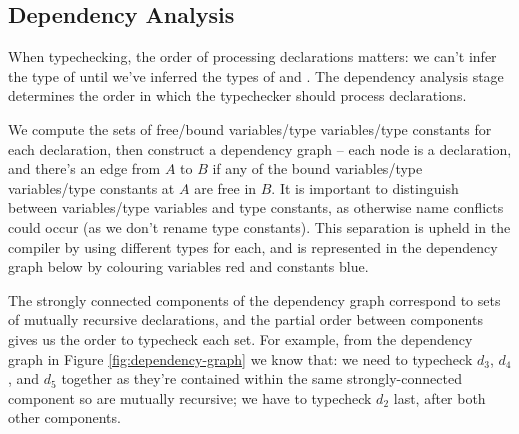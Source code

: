 \documentclass[dissertation.tex]{subfiles}
\begin{document}
{{{        }
        \subsection{Dependency Analysis}\label{sec:dependency-analysis}
        {

            When typechecking, the order of processing declarations matters: we can't infer the type of  until we've inferred the types of  and . The dependency analysis stage
            determines the order in which the typechecker should process declarations.

            We compute the sets of free/bound variables/type variables/type constants for each declaration, then
            construct a dependency graph -- each node is a declaration, and there's an edge from \(A\) to \(B\) if any
            of the bound variables/type variables/type constants at \(A\) are free in \(B\). It is important to
            distinguish between variables/type variables and type constants, as otherwise name conflicts could occur (as
            we don't rename type constants). This separation is upheld in the compiler by using different types for
            each, and is represented in the dependency graph below by colouring variables red and constants blue.

            The strongly connected components of the dependency graph correspond to sets of mutually recursive
            declarations, and the partial order between components gives us the order to typecheck each set. For
            example, from the dependency graph in Figure \ref{fig:dependency-graph} we know that: we need to typecheck
            \(d_3\), \(d_4\), and \(d_5\) together as they're contained within the same strongly-connected component so
            are mutually recursive; we have to typecheck \(d_2\) last, after both other components.

}}}
\end{document}
